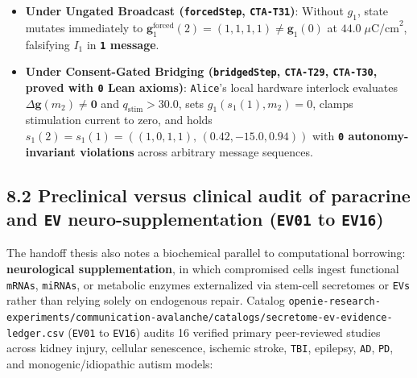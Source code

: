 \documentclass[10pt,letterpaper]{article}
\providecommand{\tightlist}{\setlength{\itemsep}{1pt}\setlength{\parskip}{0pt}}
\begin{document}
\begin{enumerate}
  \begin{itemize}
  \tightlist
  \item
    \textbf{Under Ungated Broadcast (\texttt{forcedStep},
    \texttt{CTA-T31})}: Without \(g_1\), state mutates immediately to
    \(\mathbf{g}_1^{\text{forced}}(2) = (1, 1, 1, 1) \ne \mathbf{g}_1(0)\)
    at \(44.0\;\mu\text{C/cm}^2\), falsifying \(I_1\) in
    \textbf{\texttt{1} message}.
  \item
    \textbf{Under Consent-Gated Bridging (\texttt{bridgedStep},
    \texttt{CTA-T29}, \texttt{CTA-T30}, proved with \texttt{0} Lean
    axioms)}: \texttt{Alice}'s local hardware interlock evaluates
    \(\Delta\mathbf{g}(m_2) \ne \mathbf{0}\) and
    \(q_{\text{stim}} > 30.0\), sets \(g_1(s_1(1), m_2) = 0\), clamps
    stimulation current to zero, and holds
    \(s_1(2) = s_1(1) = ((1,0,1,1),\, (0.42,-15.0,0.94))\) with
    \textbf{\texttt{0} autonomy-invariant violations} across arbitrary
    message sequences.
  \end{itemize}
\end{enumerate}

\subsection{\texorpdfstring{8.2 Preclinical versus clinical audit of
paracrine and \texttt{EV} neuro-supplementation (\texttt{EV01} to
\texttt{EV16})}{8.2 Preclinical versus clinical audit of paracrine and EV neuro-supplementation (EV01 to EV16)}}\label{preclinical-versus-clinical-audit-of-paracrine-and-ev-neuro-supplementation-ev01-to-ev16}

The handoff thesis also notes a biochemical parallel to computational
borrowing: \textbf{neurological supplementation}, in which compromised
cells ingest functional \texttt{mRNAs}, \texttt{miRNAs}, or metabolic
enzymes externalized via stem-cell secretomes or \texttt{EVs} rather
than relying solely on endogenous repair. Catalog
\texttt{openie-\allowbreak{}research-\allowbreak{}experiments/\allowbreak{}communication-\allowbreak{}avalanche/\allowbreak{}catalogs/\allowbreak{}secretome-\allowbreak{}ev-\allowbreak{}evidence-\allowbreak{}ledger.\allowbreak{}csv}
(\texttt{EV01} to \texttt{EV16}) audits 16 verified primary
peer-reviewed studies across kidney injury, cellular senescence,
ischemic stroke, \texttt{TBI}, epilepsy, \texttt{AD}, \texttt{PD}, and
monogenic/idiopathic autism models:
\end{document}
